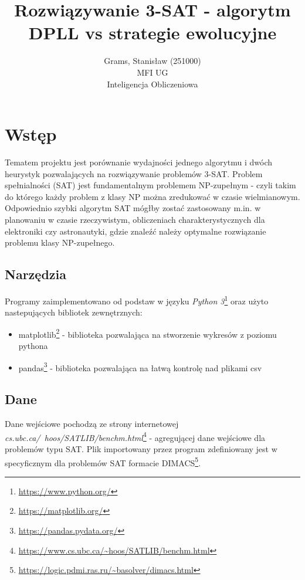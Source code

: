 \documentclass[10pt]{article}
\begin{document}
\title{Rozwiązywanie 3-SAT - algorytm DPLL vs strategie ewolucyjne}
\author{Grams, Stanisław (251000)\\ MFI UG\\Inteligencja Obliczeniowa}

\maketitle
\section {Wstęp}
Tematem projektu jest porównanie wydajności jednego algorytmu i dwóch heurystyk pozwalających na rozwiązywanie problemów 3-SAT.
Problem spełnialności (SAT) jest fundamentalnym problemem NP-zupełnym - czyli takim do którego każdy problem z klasy NP można zredukować w czasie wielmianowym.
Odpowiednio szybki algorytm SAT mógłby zostać zastosowany m.in. w planowaniu w czasie rzeczywistym, obliczeniach charakterystycznych dla elektroniki czy astronautyki, gdzie znaleźć należy optymalne rozwiązanie problemu klasy NP-zupełnego.

\subsection{Narzędzia}
Programy zaimplementowano od podstaw w języku \textit{Python 3}\footnote{\url{https://www.python.org/}} oraz użyto nastepujących bibliotek zewnętrznych:
\begin{itemize}
  \item matplotlib\footnote{\url{https://matplotlib.org/}} - biblioteka pozwalająca na stworzenie wykresów z poziomu pythona
  \item pandas\footnote{\url{https://pandas.pydata.org/}} - biblioteka pozwalająca na łatwą kontrolę nad plikami csv
\end{itemize}

\subsection{Dane}
Dane wejściowe pochodzą ze strony internetowej \textit{cs.ubc.ca/~hoos/SATLIB/benchm.html}\footnote{\url{https://www.cs.ubc.ca/~hoos/SATLIB/benchm.html}} - agregującej dane wejściowe dla problemów typu SAT.
Plik importowany przez program zdefiniowany jest w specyficznym dla problemów SAT formacie DIMACS\footnote{\url{https://logic.pdmi.ras.ru/~basolver/dimacs.html}}.
\end{document}

